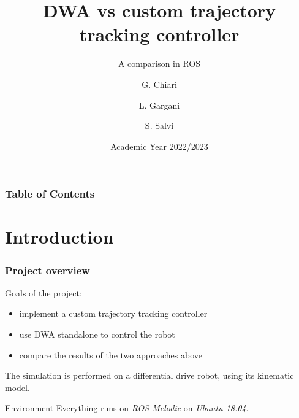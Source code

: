 \documentclass{beamer}
\title{DWA vs custom trajectory tracking controller}
\subtitle{A comparison in ROS}
\author[Chiari, Gargani, Salvi] {G. Chiari \and L. Gargani \and S. Salvi}
\institute {Politecnico di Milano}
\date {Academic Year 2022/2023}
\begin{document}
\begin{frame}
\titlepage
\end{frame}

\begin{frame}
\frametitle{Table of Contents}
\tableofcontents
\end{frame}





\section{Introduction}



\begin{frame}
\frametitle{Project overview}

Goals of the project:
\begin{itemize}
  \item implement a custom trajectory tracking controller
  \item use DWA standalone to control the robot
  \item compare the results of the two approaches above
\end{itemize}

\vspace{2em}

The simulation is performed on a differential drive robot, using its kinematic
model.

\vspace{2em}

\begin{block}{Environment}
Everything runs on \textit{ROS Melodic} on \textit{Ubuntu 18.04}.
\end{block}

\end{frame}

\end{document}
